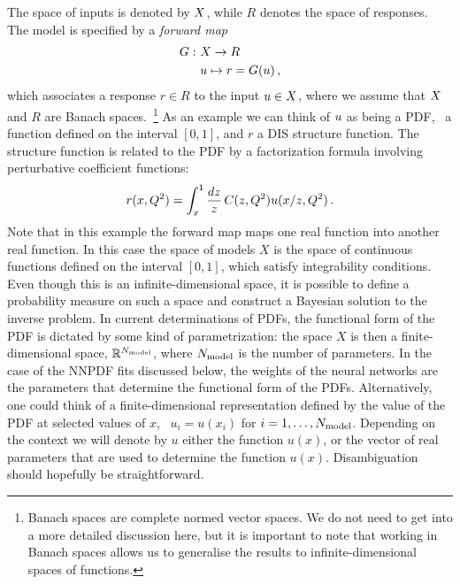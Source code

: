 The space of inputs is denoted by $X$, while $R$ denotes the space of responses.
The model is specified by a {\em forward map}
\begin{align}
  \label{eq:ForwardMap}
  G : ~& X \to R \nonumber \\
      & u \mapsto r=G(u) \, ,
\end{align}
which associates a response $r \in R$ to the input $u \in X$,
where we assume that $X$ and $R$ are Banach spaces.~\footnote{Banach
spaces are complete normed vector spaces. We do not need to get into a more
detailed discussion here, but it is important to note that working in Banach
spaces allows us to generalise the results to infinite-dimensional spaces of
functions.} As an example we can think of $u$ as being a PDF, 
\ie\ a function defined on the interval $[0,1]$, and $r$
a DIS structure function. The structure function is related to the PDF by a 
factorization formula
involving perturbative coefficient functions: 
\begin{align}
  \label{eq:DISExample}
  r(x,Q^2) = \int_x^1 \frac{dz}{z}\, C(z,Q^2) u(x/z,Q^2)\, .
\end{align}
Note that in this example the forward map maps one real function into another
real function. In this case the space of models $X$ is the space of continuous 
functions defined on the interval $[0,1]$, which satisfy integrability conditions. 
Even though this is an infinite-dimensional space, it is possible to define a 
probability measure on such a space and construct a Bayesian solution to the inverse 
problem. In current determinations of PDFs, the functional form of the PDF is 
dictated by some kind of parametrization: the space $X$ is then a finite-dimensional 
space, $\mathbb{R}^{N_{\rm model}}$, where $N_{\rm model}$ is the number of parameters. In the case of 
the NNPDF fits discussed below, the weights of the neural networks are the parameters 
that determine the functional form of the PDFs. Alternatively, one could think of a 
finite-dimensional representation defined by the value of the PDF at selected values 
of $x$, \ie\ $u_i=u(x_i)$ for $i=1,\ldots,N_{\rm model}$. Depending on 
the context we will denote by $u$ either the function $u(x)$, or the vector of real
parameters that are used to determine the function $u(x)$. Disambiguation should 
hopefully be straightforward. 


